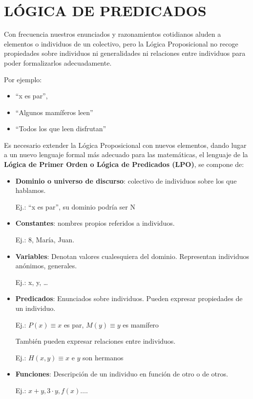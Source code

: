 \documentclass[10pt,a4paper,openright]{book}
\begin{document}
\section*{LÓGICA DE PREDICADOS}
Con frecuencia nuestros enunciados y razonamientos cotidianos aluden a elementos o individuos de un colectivo, pero la Lógica Proposicional no recoge propiedades sobre individuos ni generalidades ni relaciones entre individuos para poder formalizarlos adecuadamente.\par
Por ejemplo:
\begin{itemize}
 \item “x es par”,
 \item “Algunos mamíferos leen”
 \item “Todos los que leen disfrutan”
\end{itemize}
Es necesario extender la Lógica Proposicional con nuevos elementos, dando lugar a un nuevo lenguaje formal más adecuado para las matemáticas, el lenguaje de la \textbf{Lógica de Primer Orden o Lógica de Predicados (LPO)}, se compone de:
\begin{itemize}
 \item \textbf{Dominio o universo de discurso}: colectivo de individuos sobre los que hablamos.
 \begin{center} Ej.: “x es par”, su dominio podría ser N \end{center}

 \item \textbf{Constantes}: nombres propios referidos a individuos.
	\begin{center} Ej.: 8, María, Juan.\end{center}

 \item \textbf{Variables}: Denotan valores cualesquiera del dominio. Representan individuos anónimos, generales.
	\begin{center} Ej.: x, y, …\end{center}

 \item \textbf{Predicados}: Enunciados sobre individuos. Pueden expresar propiedades de un individuo.
	\begin{center}Ej.: $P(x) \equiv x$ es par, $M(y) \equiv y$ es mamífero\end{center}

\indent También pueden expresar relaciones entre individuos.
	\begin{center}Ej.: $H(x,y) \equiv x$ e $y$ son hermanos \end{center} 

 \item \textbf {Funciones}: Descripción de un individuo en función de otro o de otros.
	\begin{center}  Ej.: $x+y,3·y,f(x)…$.\end{center}
\end{itemize}
\end{document}
